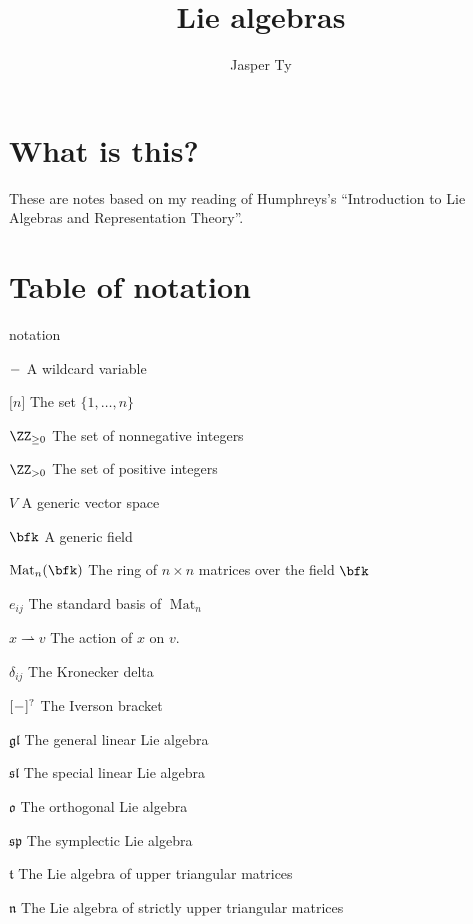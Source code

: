 \documentclass{article}
\title{Lie algebras}
\author{Jasper Ty}
\date{}
\newcommand*\wc{{\mkern 0.5mu-\mkern 0.5mu}}
\DeclareMathOperator{\Mat}{Mat}
\newcommand*\glalg{\ensuremath{\mathfrak{gl}}}
\newcommand*\slalg{\ensuremath{\mathfrak{sl}}}
\newcommand*\spalg{\ensuremath{\mathfrak{sp}}}
\newcommand*\talg{\ensuremath{\mathfrak{t}}}
\newcommand*\nalg{\ensuremath{\mathfrak{n}}}
\newcommand*\oalg{\ensuremath{\mathfrak{o}}}
\begin{document}
\maketitle

\section*{What is this?}

These are notes based on my reading of Humphreys's ``Introduction to Lie Algebras and Representation Theory''.

\tableofcontents

\newpage

\section*{Table of notation}

\begin{labeling}{notation}
    \item [$\wc$]
        A wildcard variable
    \item [$\lbrack n \rbrack$]
        The set $\{1, \ldots, n\}$
    \item [$\ZZ_{\geq 0}$]
        The set of nonnegative integers
    \item [$\ZZ_{>0}$]
        The set of positive integers
    \item [$V$]
        A generic vector space
    \item [$\bfk$]
        A generic field
    \item [$\Mat_n(\bfk)$]
        The ring of $n \times n$ matrices over the field $\bfk$
    \item [$e_{ij}$]
        The standard basis of $\Mat_n$
    \item [$x \rightharpoonup v$]
        The action of $x$ on $v$.
    \item [$\delta_{ij}$]
        The Kronecker delta
    \item [$\lbrack \wc \rbrack^?$]
        The Iverson bracket
    \item [$\glalg$]
        The general linear Lie algebra
    \item [$\slalg$]
        The special linear Lie algebra
    \item [$\oalg$]
        The orthogonal Lie algebra
    \item [$\spalg$]
        The symplectic Lie algebra
    \item [$\talg$]
        The Lie algebra of upper triangular matrices
    \item [$\nalg$]
        The Lie algebra of strictly upper triangular matrices
\end{labeling}
\end{document}
